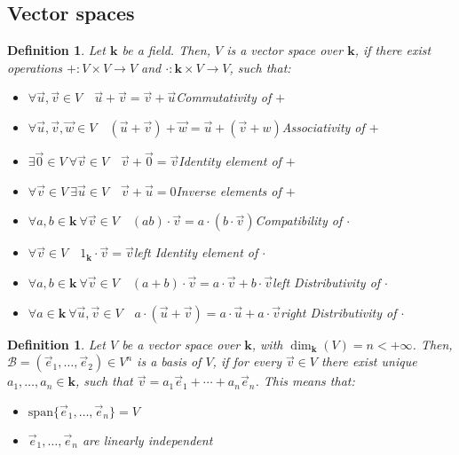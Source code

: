 \documentclass{article}
\newtheorem{definition}[theorem]{Definition}
\theoremstyle{remark}
\newcommand\spans{\mathrm{span}}
\begin{document}
    \subsection{Vector spaces}
    \begin{definition}
        Let $\mathbf{k}$ be a field. Then, $V$ is a \emph{vector space} over $\mathbf{k}$, if there exist operations $+:V\times V\to V$ and $\cdot:\mathbf{k}\times V\to V$, such that:
        \begin{itemize}
            \item $\forall \vec{u},\vec{v}\in V\quad \vec{u}+\vec{v}=\vec{v}+\vec{u}$\hfill Commutativity of $+$
            \item $\forall \vec{u},\vec{v},\vec{w}\in V\quad (\vec{u}+\vec{v})+\vec{w}=\vec{u}+(\vec{v}+w)$\hfill Associativity of $+$
            \item $\exists \vec{0}\in V\ \forall \vec{v}\in V\quad \vec{v}+\vec{0}=\vec{v}$\hfill Identity element of $+$
            \item $\forall \vec{v}\in V\ \exists \vec{u}\in V\quad \vec{v}+\vec{u}=0$\hfill Inverse elements of $+$ 
            \item $\forall a,b\in \mathbf{k}\ \forall \vec{v}\in V\quad (ab)\cdot\vec{v}=a\cdot(b\cdot\vec{v})$\hfill Compatibility of $\cdot$
            \item $\forall \vec{v}\in V\quad 1_{\mathbf{k}}\cdot\vec{v}=\vec{v}$\hfill left Identity element of $\cdot$
            \item $\forall a,b\in\mathbf{k}\ \forall \vec{v}\in V\quad (a+b)\cdot\vec{v}=a\cdot\vec{v}+b\cdot\vec{v}$\hfill left Distributivity of $\cdot$
            \item $\forall a\in\mathbf{k}\ \forall \vec{u},\vec{v}\in V\quad a\cdot(\vec{u}+\vec{v})=a\cdot\vec{u}+a\cdot\vec{v}$\hfill right Distributivity of $\cdot$
        \end{itemize}
    \end{definition}
    \begin{definition}
        Let $V$ be a vector space over $\mathbf{k}$, with $\dim_{\mathbf{k}}(V)=n<+\infty$. Then, $\mathcal{B}=(\vec{e}_1,\ldots,\vec{e}_2)\in V^n$ is a \emph{basis} of $V$, if for every $\vec{v}\in V$ there exist unique $a_1,\ldots,a_n\in\mathbf{k}$, such that $\vec{v}=a_1\vec{e}_1+\cdots+a_n\vec{e}_n$. This means that:\begin{itemize}
            \item $\spans\{\vec{e}_1,\ldots,\vec{e}_n\}=V$
            \item $\vec{e}_1,\ldots,\vec{e}_n$ are linearly independent
        \end{itemize}
    \end{definition}
\end{document}
